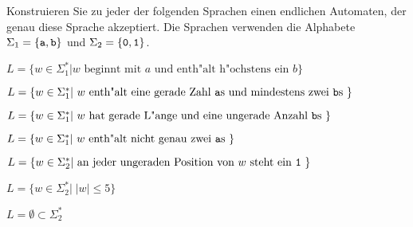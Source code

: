 Konstruieren Sie zu jeder der folgenden Sprachen einen
endlichen Automaten, der genau diese Sprache akzeptiert.
Die Sprachen verwenden die Alphabete
$\Sigma_1=\{{\tt a},{\tt b}\}$ und
$\Sigma_2=\{{\tt 0},{\tt 1}\}$.
\begin{teilaufgaben}
\item
$L=\{w\in \Sigma_1^*|\text{
$w$ beginnt mit $a$ und enth"alt h"ochstens ein $b$
}\}$
\item
$L=\{w\in \Sigma_1^*|\text{
$w$ enth"alt eine gerade Zahl {\tt a}s und mindestens
zwei {\tt b}s
}\}$
\item
$L=\{w\in \Sigma_1^*|\text{
$w$ hat gerade L"ange und eine ungerade Anzahl {\tt b}s
}\}$
\item
$L=\{w\in \Sigma_1^*|\text{
$w$ enth"alt nicht genau zwei {\tt a}s
}\}$
\item
$L=\{w\in \Sigma_2^*|\text{
an jeder ungeraden Position von $w$ steht ein {\tt 1}
}\}$
\item
$L=\{w\in \Sigma_2^*|\;|w|\le 5\}$
\item
$L=\emptyset\subset \Sigma_2^*$
\end{teilaufgaben}

